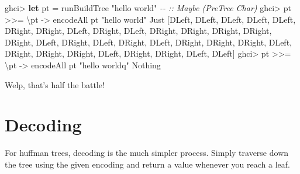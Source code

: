 \documentclass[]{article}
\newenvironment{Shaded}{}{}
\newcommand{\CommentTok}[1]{\textcolor[rgb]{0.38,0.63,0.69}{\textit{#1}}}
\newcommand{\DataTypeTok}[1]{\textcolor[rgb]{0.56,0.13,0.00}{#1}}
\newcommand{\KeywordTok}[1]{\textcolor[rgb]{0.00,0.44,0.13}{\textbf{#1}}}
\newcommand{\NormalTok}[1]{#1}
\newcommand{\OperatorTok}[1]{\textcolor[rgb]{0.40,0.40,0.40}{#1}}
\newcommand{\OtherTok}[1]{\textcolor[rgb]{0.00,0.44,0.13}{#1}}
\newcommand{\StringTok}[1]{\textcolor[rgb]{0.25,0.44,0.63}{#1}}
\begin{document}
\begin{Shaded}
\begin{Highlighting}[]
\NormalTok{ghci}\OperatorTok{>} \KeywordTok{let}\NormalTok{ pt }\OtherTok{=}\NormalTok{ runBuildTree }\StringTok{"hello world"}          \CommentTok{{-}{-} :: Maybe (PreTree Char)}
\NormalTok{ghci}\OperatorTok{>}\NormalTok{ pt }\OperatorTok{>>=}\NormalTok{ \textbackslash{}pt\textquotesingle{} }\OtherTok{{-}>}\NormalTok{ encodeAll pt\textquotesingle{} }\StringTok{"hello world"}
\DataTypeTok{Just}\NormalTok{ [}\DataTypeTok{DLeft}\NormalTok{, }\DataTypeTok{DLeft}\NormalTok{, }\DataTypeTok{DLeft}\NormalTok{, }\DataTypeTok{DLeft}\NormalTok{, }\DataTypeTok{DLeft}\NormalTok{, }\DataTypeTok{DRight}\NormalTok{, }\DataTypeTok{DRight}\NormalTok{, }\DataTypeTok{DLeft}\NormalTok{, }\DataTypeTok{DRight}\NormalTok{, }\DataTypeTok{DLeft}\NormalTok{,}
\DataTypeTok{DRight}\NormalTok{, }\DataTypeTok{DRight}\NormalTok{, }\DataTypeTok{DRight}\NormalTok{, }\DataTypeTok{DRight}\NormalTok{, }\DataTypeTok{DRight}\NormalTok{, }\DataTypeTok{DLeft}\NormalTok{, }\DataTypeTok{DRight}\NormalTok{, }\DataTypeTok{DLeft}\NormalTok{, }\DataTypeTok{DRight}\NormalTok{, }\DataTypeTok{DLeft}\NormalTok{,}
\DataTypeTok{DRight}\NormalTok{, }\DataTypeTok{DRight}\NormalTok{, }\DataTypeTok{DRight}\NormalTok{, }\DataTypeTok{DLeft}\NormalTok{, }\DataTypeTok{DRight}\NormalTok{, }\DataTypeTok{DRight}\NormalTok{, }\DataTypeTok{DRight}\NormalTok{, }\DataTypeTok{DLeft}\NormalTok{, }\DataTypeTok{DRight}\NormalTok{, }\DataTypeTok{DRight}\NormalTok{,}
\DataTypeTok{DLeft}\NormalTok{, }\DataTypeTok{DLeft}\NormalTok{]}
\NormalTok{ghci}\OperatorTok{>}\NormalTok{ pt }\OperatorTok{>>=}\NormalTok{ \textbackslash{}pt\textquotesingle{} }\OtherTok{{-}>}\NormalTok{ encodeAll pt\textquotesingle{} }\StringTok{"hello worldq"}
\DataTypeTok{Nothing}
\end{Highlighting}
\end{Shaded}

Welp, that's half the battle!

\hypertarget{decoding}{%
\section{Decoding}\label{decoding}}

For huffman trees, decoding is the much simpler process. Simply traverse down
the tree using the given encoding and return a value whenever you reach a leaf.
\end{document}
